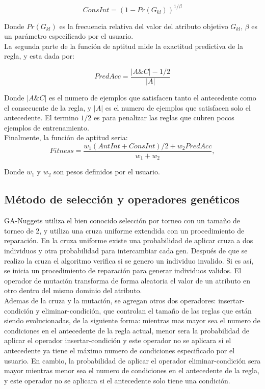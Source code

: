 \begin{equation} \label{eq:5}
ConsInt= (1-Pr(G_{kl}))^{1/\beta}
\end{equation}

Donde $Pr(G_{kl})$ es la frecuencia relativa del valor del atributo objetivo $G_{kl}$, $\beta$ es un parámetro especificado por el usuario.
\\
La segunda parte de la función de aptitud mide la exactitud predictiva de la regla, y esta dada por:

\begin{equation} \label{eq:6}
PredAcc= \frac{|A\&C|-1/2}{|A|}
\end{equation}

Donde $|A\&C|$ es el numero de ejemplos que satisfacen tanto el antecedente como el consecuente de la regla, y $|A|$ es el numero de ejemplos que satisfacen solo el antecedente. El termino $1/2$ es para penalizar las reglas que cubren pocos ejemplos de entrenamiento.
\\
Finalmente, la función de aptitud seria:
\begin{equation} \label{eq:7}
Fitness= \frac{w_1(AntInt+ConsInt)/2+w_2PredAcc}{w_1+w_2},
\end{equation}

Donde $w_1$ y $w_2$ son pesos definidos por el usuario.

\subsection{Método de selección y operadores genéticos}

GA-Nuggets utiliza el bien conocido selección por torneo con un tamaño de torneo de 2, y utiliza una cruza uniforme extendida con un procedimiento de reparación. En la cruza uniforme existe una probabilidad de aplicar cruza a dos individuos y otra probabilidad para intercambiar cada gen. Después de que se realizo la cruza el algoritmo verifica si se genero un individuo invalido. Si es así, se inicia un procedimiento de reparación para generar individuos validos. El operador de mutación transforma de forma aleatoria el valor de un atributo en otro dentro del mismo dominio del atributo.
\\
Ademas de la cruza y la mutación, se agregan otros dos operadores: insertar-condición y eliminar-condición, que controlan el tamaño de las reglas que están siendo evolucionadas, de la siguiente forma: mientras mas mayor sea el numero de condiciones en el antecedente de la regla actual, menor sera la probabilidad de aplicar el operador insertar-condición y este operador no se aplicara si el antecedente ya tiene el máximo numero de condiciones especificado por el usuario. En cambio, la probabilidad de aplicar el operador eliminar-condición sera mayor mientras menor sea el numero de condiciones en el antecedente de la regla, y este operador no se aplicara si el antecedente solo tiene una condición.

